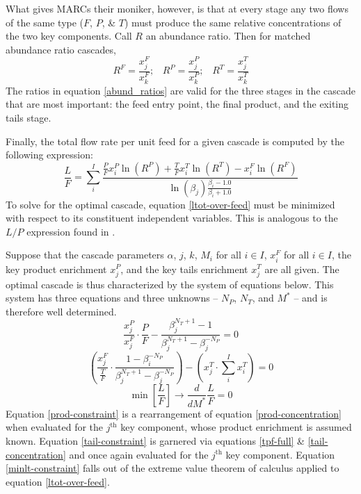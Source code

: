 \documentclass[preprint,12pt]{elsarticle}
\newcommand{\jth}[0]{$j^{\mbox{th}}$ }
\begin{document}
What gives MARCs their moniker, however, is that at every stage any two flows of 
the same type ($F$, $P$, \& $T$) must produce the same relative concentrations of 
the two key components.  Call $R$ an abundance ratio.  Then for matched abundance 
ratio cascades, 
\begin{equation}
R^F = \frac{x_j^F}{x_k^F}; \;\;\; R^P = \frac{x_j^P}{x_k^P}; \;\;\; 
R^T = \frac{x_j^T}{x_k^T}
\label{abund_ratios}
\end{equation}
The ratios in equation \ref{abund_ratios} are valid for the three stages in the 
cascade that are most important: the feed entry point, the final product, and the 
exiting tails stage.

Finally, the total flow rate per unit feed for a given cascade is computed by 
the following expression:
\begin{equation}
\frac{L}{F} = \sum_i^I \frac{\frac{P}{F}x_i^P\ln(R^P) + \frac{T}{F}x_i^T\ln(R^T) 
                                                      - x_i^F\ln(R^F)}
                            {\ln(\beta_j)\frac{\beta_i - 1.0}{\beta_i + 1.0}}
\label{ltot-over-feed}
\end{equation}
To solve for the optimal cascade, equation \ref{ltot-over-feed} must be minimized
with respect to its constituent independent variables.
This is analogous to the $L/P$ expression found in \cite{Wood1999}.

Suppose that the cascade parameters 
$\alpha$, 
$j$, $k$, 
$M_i$ for all $i\in I$, 
$x_i^F$ for all $i\in I$, 
the key product enrichment $x_j^P$, and the key 
tails enrichment $x_j^T$ are all given.  The optimal cascade is thus characterized by 
the system of equations below. This system has three equations and three unknowns --
$N_P$, $N_T$, and $M^*$ -- and is therefore well determined.
\begin{equation}
\frac{x_j^P}{x_j^F}\cdot\frac{P}{F} - \frac{\beta_j^{N_T+1} - 1}
                                           {\beta_j^{N_T+1} - \beta_j^{-N_P}} = 0
\label{prod-constraint}
\end{equation}
\begin{equation}
\left(\frac{x_j^F}{\frac{T}{F}} \cdot \frac{1 - \beta_i^{-N_P}}
                                           {\beta_j^{N_T+1} - \beta_j^{-N_P}} \right)
- \left(x_j^T\cdot\sum_i^{I} x_i^T\right) = 0
\label{tail-constraint}
\end{equation}
\begin{equation}
\min\left[\frac{L}{F}\right]\to \frac{d}{dM^*} \frac{L}{F} = 0
\label{minlt-constraint}
\end{equation}
Equation \ref{prod-constraint} is a rearrangement of equation \ref{prod-concentration}
when evaluated for the \jth key component, whose product enrichment is assumed
known.  Equation \ref{tail-constraint} is garnered via equations \ref{tpf-full} \&
\ref{tail-concentration} and once again evaluated for the \jth key component.
Equation \ref{minlt-constraint} falls out of the extreme value theorem of calculus
applied to equation \ref{ltot-over-feed}.
\end{document}
